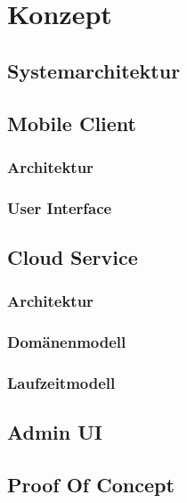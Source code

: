 \section{Konzept}

\subsection{Systemarchitektur}

\subsection{Mobile Client}
    \subsubsection{Architektur}
    \subsubsection{User Interface}

\subsection{Cloud Service}
    \subsubsection{Architektur}
    \subsubsection{Domänenmodell}
    \subsubsection{Laufzeitmodell}

\subsection{Admin UI}

\subsection{Proof Of Concept}
